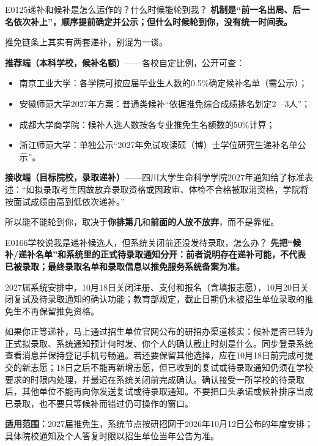 \begin{qa}{E0125}{递补和候补是怎么运作的？什么时候能轮到我？}
\textbf{机制是“前一名出局、后一名依次补上”，顺序提前确定并公示；但什么时候轮到你，没有统一时间表。}

推免链条上其实有两套递补，别混为一谈。

\textbf{推荐端（本科学校，候补名额）}——各校自定比例，公开可查：
\begin{itemize}
  \item 南京工业大学：各学院可按应届毕业生人数的0.5\%确定候补名单（需公示）；
  \item 安徽师范大学2027年方案：普通类候补“依据推免综合成绩排名划定2—3人”；
  \item 成都大学商学院：候补人选人数按各专业推免生名额数的50\%计算；
  \item 浙江师范大学：单独公示“2027年免试攻读硕（博）士学位研究生递补名单公示”。
\end{itemize}

\textbf{接收端（目标院校，录取递补）}——四川大学生命科学学院2027年通知给了标准表述：“如拟录取考生因故放弃录取资格或因政审、体检不合格被取消资格，学院将按面试成绩由高到低依次递补。”

所以能不能轮到你，取决于\textbf{你排第几}和\textbf{前面的人放不放弃}，而不是靠催。
\end{qa}

\begin{qa}{E0166}{学校说我是递补候选人，但系统关闭前还没发待录取，怎么办？}
\textbf{先把“候补/递补名单”和系统里的正式待录取通知分开：前者说明存在递补可能，不代表已被录取；最终录取名单和录取信息以推免服务系统备案为准。}

2027届系统安排中，10月18日关闭注册、支付和报名（含填报志愿），10月20日关闭复试及待录取通知的确认功能；教育部规定，截止日期仍未被招生单位录取的推免生不再保留推免资格。

如果你正等递补，马上通过招生单位官网公布的研招办渠道核实：候补是否已转为正式拟录取、系统通知预计何时发、你个人的确认截止时刻是什么。同步登录系统查看消息并保持登记手机号畅通。若还要保留其他选择，应在10月18日前完成可提交的新志愿；18日之后不能再新增志愿，但已收到的复试或待录取通知仍须在学校要求的时限内处理，并最迟在系统关闭前完成确认。确认接受一所学校的待录取后，其他单位不能再向你发送复试或待录取通知。不要把口头承诺或候补排序当成已录取，也不要只等候补而错过仍可操作的窗口。

\textbf{适用范围：}2027届推免生，系统节点按研招网于2026年10月12日公布的年度安排；具体院校通知及个人答复时限以招生单位当年公告为准。
\end{qa}

